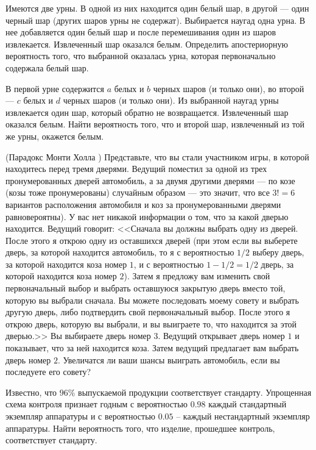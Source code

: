 \begin{problem}
Имеются две урны. В одной из них находится один белый шар, в другой --- один черный шар (других шаров урны не содержат). Выбирается 
наугад одна урна. В нее добавляется один белый шар и после перемешивания один из шаров извлекается. Извлеченный шар оказался белым. 
Определить апостериорную вероятность того, что выбранной оказалась урна, которая первоначально содержала белый шар. 
\end{problem}


\begin{problem}
В первой урне содержится $a$ белых и $b$ черных шаров (и только они), во второй --- $c$ белых и $d$ черных шаров 
(и только они). Из выбранной наугад урны извлекается один шар, который обратно не возвращается. Извлеченный шар оказался белым. 
Найти вероятность того, что и второй шар, извлеченный из той же урны, окажется белым. 
\end{problem}

\begin{problem}(Парадокс Монти Холла \cite{book12})
Представьте, что вы стали участником игры, в которой находитесь перед тремя дверями. Ведущий поместил за одной из трех 
пронумерованных дверей автомобиль, а за двумя другими дверями --- по козе (козы тоже пронумерованы) случайным образом --– это значит, 
что все $3! = 6$ вариантов расположения автомобиля и коз за пронумерованными дверями равновероятны). У вас нет никакой информации 
о том, что за какой дверью находится. Ведущий говорит: <<Сначала вы должны выбрать одну из дверей. После этого я открою одну из 
оставшихся дверей (при этом если вы выберете дверь, за которой находится автомобиль, то я с вероятностью $1/2$ выберу дверь, 
за которой находится коза номер $1$, и с вероятностью $1-1/2=1/2$ дверь, за которой находится коза номер $2$). Затем я предложу 
вам изменить свой первоначальный выбор и выбрать оставшуюся закрытую дверь вместо той, которую вы выбрали сначала. Вы можете 
последовать моему совету и выбрать другую дверь, либо подтвердить свой первоначальный выбор. После этого я открою дверь, 
которую вы выбрали, и вы выиграете то, что находится за этой дверью.>> Вы выбираете дверь номер $3$. Ведущий открывает дверь номер $1$ 
и показывает, что за ней находится коза. Затем ведущий предлагает вам выбрать дверь номер $2$. Увеличатся ли ваши шансы 
выиграть автомобиль, если вы последуете его совету? 
\end{problem}


\begin{problem}
Известно, что $96\%$ выпускаемой продукции соответствует стандарту. Упрощенная схема контроля признает годным с вероятностью 
$0.98$ каждый стандартный экземпляр аппаратуры и с вероятностью $0.05$ -- каждый нестандартный экземпляр аппаратуры. Найти вероятность того, 
что изделие, прошедшее контроль, соответствует стандарту. 
\end{problem}


